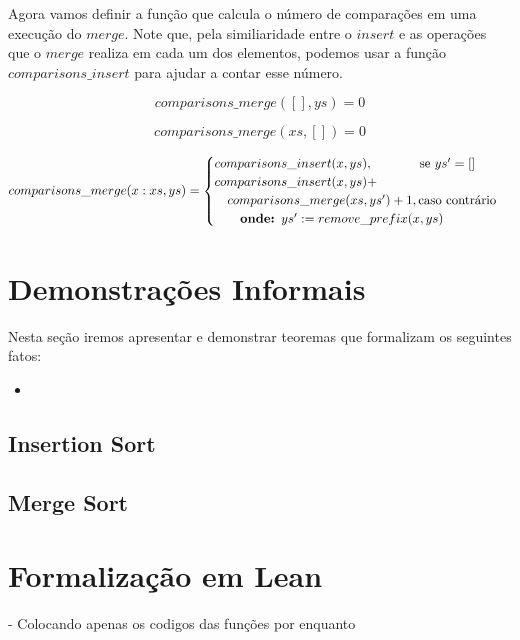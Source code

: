 \documentclass[12pt, oneside, a4paper,english,brazil]{abntex2}
\begin{document}
\qquad Agora vamos definir a fun\c{c}\~ao que calcula o n\'umero de compara\c{c}\~oes em uma execu\c{c}\~ao
do $merge$. Note que, pela similiaridade entre
o $insert$ e as opera\c{c}\~oes que o $merge$ realiza em cada um dos elementos,
podemos usar a fun\c{c}\~ao $comparisons\_insert$ para ajudar a contar esse n\'umero.

\begin{equation}
  comparisons\_merge([], ys) = 0
\end{equation}

\begin{equation}
  comparisons\_merge(xs, []) = 0
\end{equation}

\begin{equation}
\begin{split}
  comparisons\_merge(x : xs, ys) =
      \begin{cases}
        comparisons\_insert(x, ys), \text{\qquad \quad \,\, se } ys' = [] \\
        comparisons\_insert(x, ys) + \\ \text{\quad} comparisons\_merge(xs, ys') + 1, \text{caso contr\'ario}\\
        \text{\qquad\textbf{onde: }} ys' := remove\_prefix(x, ys)
      \end{cases} \\
\end{split}
\end{equation}

\chapter{Demonstra\c{c}\~oes Informais}

Nesta se\c{c}\~ao iremos apresentar e demonstrar teoremas que formalizam os seguintes fatos:
\begin{itemize}
  \item
\end{itemize}


\section{Insertion Sort}
\section{Merge Sort}

\chapter{Formaliza\c{c}\~ao em Lean}
- Colocando apenas os codigos das fun\c{c}\~oes por enquanto
\end{document}
